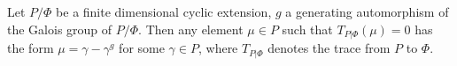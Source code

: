 Let $P/\Phi$ be a finite dimensional cyclic extension, $g$ a generating automorphism of the Galois group of $P/\Phi$. Then any element $\mu \in P$ such that $T_{P|\Phi}(\mu) = 0$ has the form $\mu = \gamma - \gamma^g$ for some $\gamma \in P$, where $T_{P|\Phi}$ denotes the trace from $P$ to $\Phi$.
